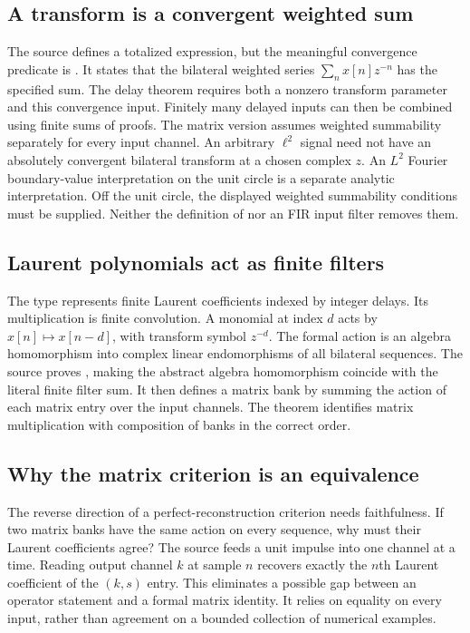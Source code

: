 \subsection{A transform is a convergent weighted sum}
The source defines a totalized  expression, but the meaningful convergence predicate is .
It states that the bilateral weighted series $\sum_n x[n]z^{-n}$ has the specified sum. The delay theorem requires both a nonzero transform parameter and this convergence input.
Finitely many delayed inputs can then be combined using finite sums of  proofs. The matrix version assumes weighted summability separately for every input channel.
An arbitrary $\ell^2$ signal need not have an absolutely convergent bilateral transform at a chosen complex $z$. An $L^2$ Fourier boundary-value interpretation on the unit circle is a separate analytic interpretation. Off the unit circle, the displayed weighted summability conditions must be supplied. Neither the definition of  nor an FIR input filter removes them.

\subsection{Laurent polynomials act as finite filters}
The type  represents finite Laurent coefficients indexed by integer delays. Its multiplication is finite convolution. A monomial at index $d$ acts by $x[n]\mapsto x[n-d]$, with transform symbol $z^{-d}$. The formal action is an algebra homomorphism into complex linear endomorphisms of all bilateral sequences.
The source proves , making the abstract algebra homomorphism coincide with the literal finite filter sum. It then defines a matrix bank by summing the action of each matrix entry over the input channels. The theorem  identifies matrix multiplication with composition of banks in the correct order.

\subsection{Why the matrix criterion is an equivalence}
The reverse direction of a perfect-reconstruction criterion needs faithfulness. If two matrix banks have the same action on every sequence, why must their Laurent coefficients agree? The source feeds a unit impulse into one channel at a time. Reading output channel $k$ at sample $n$ recovers exactly the $n$th Laurent coefficient of the $(k,s)$ entry.
This eliminates a possible gap between an operator statement and a formal matrix identity. It relies on equality on every input, rather than agreement on a bounded collection of numerical examples.

